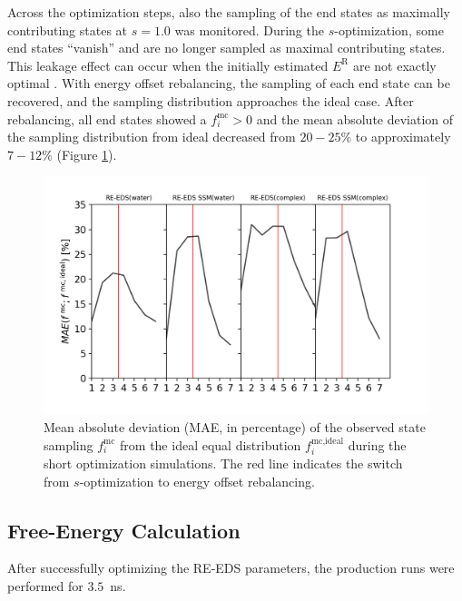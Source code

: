 Across the optimization steps, also the sampling of the end states as maximally contributing states at $s=1.0$ was monitored.
During the $s$-optimization, some end states ``vanish'' and are no longer sampled as maximal contributing states. This leakage effect can occur when the initially estimated $E^{\text{R}}$ are not exactly optimal \cite{Sidler2016}. 
With energy offset rebalancing, the sampling of each end state can be recovered, and the sampling distribution approaches the ideal case.
After rebalancing, all end states showed a $f_i^{\text{mc}} > 0$ and the mean absolute deviation of the sampling distribution from ideal decreased from $20-25\%$ to approximately $7-12\%$ (Figure \ref{SIfig:CHK1_RingOpening_optimization_fractOptSampMAE}). 
 


\begin{figure}[H]
\centering
\includegraphics[width=\linewidth]{fig/results/ringOpening/paramOptimization/RingOpening_optimization_fractOptSampMAE.png}
\caption{Mean absolute deviation (MAE, in percentage) of the observed state sampling $f_i^{\text{mc}}$ from the ideal equal distribution $f_i^{\text{mc,ideal}}$ during the short optimization simulations. The red line indicates the switch from $s$-optimization to energy offset rebalancing.}
\label{SIfig:CHK1_RingOpening_optimization_fractOptSampMAE}
\end{figure}

\FloatBarrier

\subsection{Free-Energy Calculation}
After successfully optimizing the RE-EDS parameters, the production runs were performed for $3.5$~ns. 


